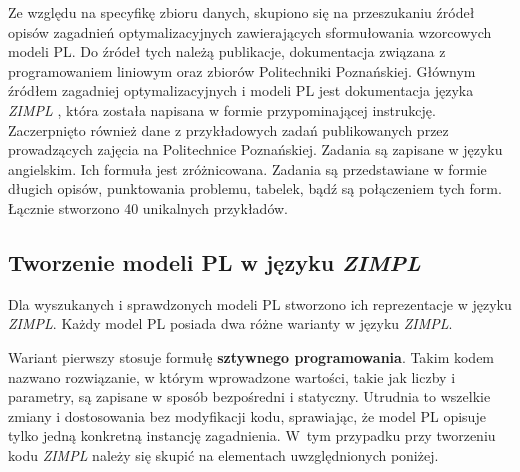 Ze względu na specyfikę zbioru danych, skupiono się na przeszukaniu źródeł opisów zagadnień optymalizacyjnych zawierających sformułowania wzorcowych modeli PL.
Do źródeł tych należą publikacje, dokumentacja związana z programowaniem liniowym\cite{brilliant_linear,byjus_linear,cimt,arsdcollege2020,libretexts_linear,superprof_linear,toppr_graphical} oraz zbiorów Politechniki Poznańskiej. %
Głównym źródłem zagadniej optymalizacyjnych i modeli PL jest dokumentacja języka  \textit{ZIMPL} \cite{TODO}, która została napisana w formie przypominającej instrukcję. Zaczerpnięto również dane z przykładowych zadań publikowanych przez prowadzących zajęcia na Politechnice Poznańskiej. Zadania są zapisane w języku angielskim. Ich formuła jest zróżnicowana. Zadania są przedstawiane w formie długich opisów, punktowania problemu, tabelek, bądź są połączeniem tych form. Łącznie stworzono 40 unikalnych przykładów.

\subsection{Tworzenie modeli PL w języku \textit{ZIMPL}}

Dla wyszukanych i sprawdzonych modeli PL stworzono ich reprezentacje w języku \textit{ZIMPL}. %
Każdy model PL posiada dwa różne warianty w języku  \textit{ZIMPL}. %

Wariant pierwszy stosuje formułę \textbf{sztywnego programowania}. Takim kodem nazwano rozwiązanie, w którym wprowadzone wartości, takie jak liczby i parametry, są zapisane w sposób bezpośredni i statyczny. Utrudnia to wszelkie zmiany i dostosowania bez modyfikacji kodu, sprawiając, że model PL opisuje tylko jedną konkretną instancję zagadnienia. W~tym przypadku przy tworzeniu kodu  \textit{ZIMPL} należy się skupić na elementach uwzględnionych poniżej.


